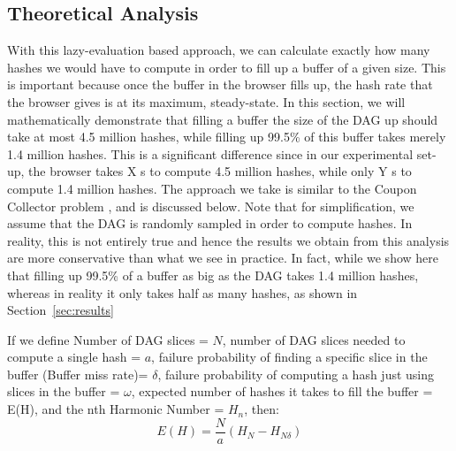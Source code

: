 \documentclass[runningheads]{llncs}
\begin{document}
\subsection{Theoretical Analysis}
With this lazy-evaluation based approach, we can calculate exactly how many hashes we would have to compute in order to fill up a buffer of a given size. This is important because once the buffer in the browser fills up, the hash rate that the browser gives is at its maximum, steady-state. In this section, we will mathematically demonstrate that filling a buffer the size of the DAG up should take at most 4.5 million hashes, while filling up 99.5\% of this buffer takes merely 1.4 million hashes. This is a significant difference since in our experimental set-up, the browser takes X s to compute 4.5 million hashes, while only Y s to compute 1.4 million hashes. The approach we take is similar to the Coupon Collector problem \cite{couponCollector}, and is discussed below. Note that for simplification, we assume that the DAG is randomly sampled in order to compute hashes. In reality, this is not entirely true and hence the results we obtain from this analysis are more conservative than what we see in practice. In fact, while we show here that filling up 99.5\% of a buffer as big as the DAG takes 1.4 million hashes, whereas in reality it only takes half as many hashes, as shown in Section~\ref{sec:results} \\
\begin{claim}
If we define Number of DAG slices = $N$, number of DAG slices needed to compute a single hash = $a$, failure probability of finding a specific slice in the buffer (Buffer miss rate)= $\delta$, failure probability of computing a hash just using slices in the buffer = $\omega$, expected number of hashes it takes to fill the buffer = E(H), and the nth Harmonic Number = $H_n$, then: \\
\begin{equation}
	E(H) = \frac{N}{a}(H_{N} -H_{N\delta})
\end{equation}
\end{claim} 

\end{document}
